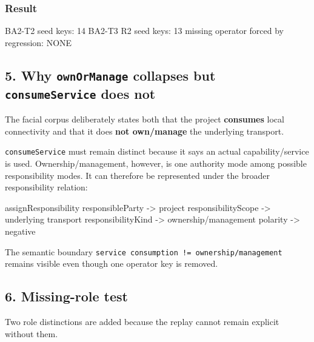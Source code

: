 \documentclass[
  10pt,
  a4paper,
]{article}
\newenvironment{Shaded}{}{}
\newcommand{\NormalTok}[1]{#1}
\begin{document}
\subsubsection{Result}\label{result}

\begin{Shaded}
\begin{Highlighting}[]
\NormalTok{BA2{-}T2 seed keys: 14}
\NormalTok{BA2{-}T3 R2 seed keys: 13}
\NormalTok{missing operator forced by regression: NONE}
\end{Highlighting}
\end{Shaded}

\subsection{\texorpdfstring{5. Why \texttt{ownOrManage} collapses but
\texttt{consumeService} does
not}{5. Why ownOrManage collapses but consumeService does not}}\label{5-why-ownormanage-collapses-but-consumeservice-does-not}

The facial corpus deliberately states both that the project
\textbf{consumes} local connectivity and that it does \textbf{not
own/manage} the underlying transport.

\texttt{consumeService} must remain distinct because it says an actual
capability/service is used. Ownership/management, however, is one
authority mode among possible responsibility modes. It can therefore be
represented under the broader responsibility relation:

\begin{Shaded}
\begin{Highlighting}[]
\NormalTok{assignResponsibility}
\NormalTok{  responsibleParty    {-}\textgreater{} project}
\NormalTok{  responsibilityScope {-}\textgreater{} underlying transport}
\NormalTok{  responsibilityKind  {-}\textgreater{} ownership/management}
\NormalTok{  polarity            {-}\textgreater{} negative}
\end{Highlighting}
\end{Shaded}

The semantic boundary
\texttt{service\ consumption\ !=\ ownership/management} remains visible
even though one operator key is removed.

\subsection{6. Missing-role test}\label{6-missing-role-test}

Two role distinctions are added because the replay cannot remain
explicit without them.
\end{document}
